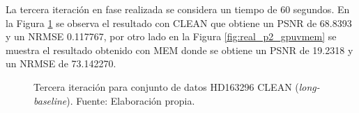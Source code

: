 La tercera iteración en fase realizada se considera un tiempo de 60 segundos. En la Figura \ref{fig:real_p2_clean} se observa el resultado con CLEAN que obtiene un PSNR de 68.8393 y un NRMSE 0.117767, por otro lado en la Figura \ref{fig:real_p2_gpuvmem} se muestra el resultado obtenido con MEM donde se obtiene un PSNR de 19.2318 y un NRMSE de 73.142270.

\begin{figure}[!ht]
 \centering
    \vspace{0.3cm}
 \caption[Tercera iteración para conjunto de datos HD163296 CLEAN (\textit{long-baseline})]{Tercera iteración para conjunto de datos HD163296 CLEAN (\textit{long-baseline}). Fuente: Elaboración propia.}
 \label{fig:real_p2_clean}
\end{figure}

